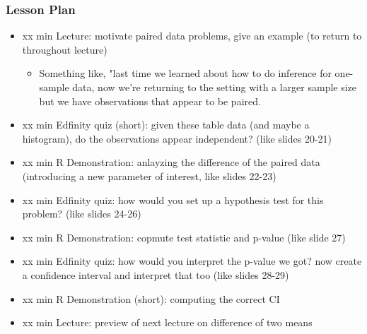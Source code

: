 \begin{frame}
    \frametitle{Lesson Plan}
    \begin{itemize}
        \item xx min Lecture: motivate paired data problems, give an example (to return to throughout lecture)
        \begin{itemize}
            \item Something like, "last time we learned about how to do inference for one-sample data, now we're returning to the setting with a larger sample size but we have observations that appear to be paired.
        \end{itemize}    
        \item xx min Edfinity quiz (short): given these table data (and maybe a histogram), do the observations appear independent? (like slides 20-21)
        \item xx min R Demonstration: anlayzing the difference of the paired data (introducing a new parameter of interest, like slides 22-23)
        \item xx min Edfinity quiz: how would you set up a hypothesis test for this problem? (like slides 24-26)
        \item xx min R Demonstration: copmute test statistic and p-value (like slide 27)
        \item xx min Edfinity quiz: how would you interpret the p-value we got? now create a confidence interval and interpret that too (like slides 28-29)
        \item xx min R Demonstration (short): computing the correct CI
        \item xx min Lecture: preview of next lecture on difference of two means
    \end{itemize}

\end{frame}
            
